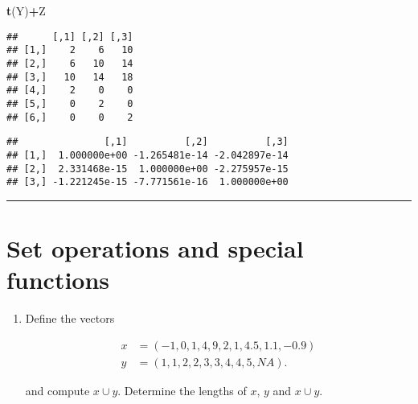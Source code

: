 \documentclass[]{article}
\newenvironment{Shaded}{\begin{snugshade}}{\end{snugshade}}
\newcommand{\KeywordTok}[1]{\textcolor[rgb]{0.13,0.29,0.53}{\textbf{#1}}}
\newcommand{\OperatorTok}[1]{\textcolor[rgb]{0.81,0.36,0.00}{\textbf{#1}}}
\newcommand{\NormalTok}[1]{#1}
\providecommand{\tightlist}{%
  \setlength{\itemsep}{0pt}\setlength{\parskip}{0pt}}
\begin{document}
\begin{Shaded}
\begin{Highlighting}[]
\KeywordTok{t}\NormalTok{(Y)}\OperatorTok{+}\NormalTok{Z}
\end{Highlighting}
\end{Shaded}

\begin{verbatim}
##      [,1] [,2] [,3]
## [1,]    2    6   10
## [2,]    6   10   14
## [3,]   10   14   18
## [4,]    2    0    0
## [5,]    0    2    0
## [6,]    0    0    2
\end{verbatim}

\begin{Shaded}
\end{Shaded}

\begin{verbatim}
##               [,1]          [,2]          [,3]
## [1,]  1.000000e+00 -1.265481e-14 -2.042897e-14
## [2,]  2.331468e-15  1.000000e+00 -2.275957e-15
## [3,] -1.221245e-15 -7.771561e-16  1.000000e+00
\end{verbatim}

\begin{center}\rule{0.5\linewidth}{\linethickness}\end{center}

\section{Set operations and special
functions}\label{set-operations-and-special-functions}

\begin{enumerate}
\def\labelenumi{\arabic{enumi}.}
\tightlist
\item
  Define the vectors

  \begin{align*}
  x &=\left( -1,0,1,4,9,2,1,4.5,1.1,-0.9\right) \\
  y &=\left( 1,1,2,2,3,3,4,4,5,NA\right) .
  \end{align*}

  and compute \(x\cup y\). Determine the lengths of \(x\), \(y\) and
  \(x\cup y\).
\end{enumerate}
\end{document}
